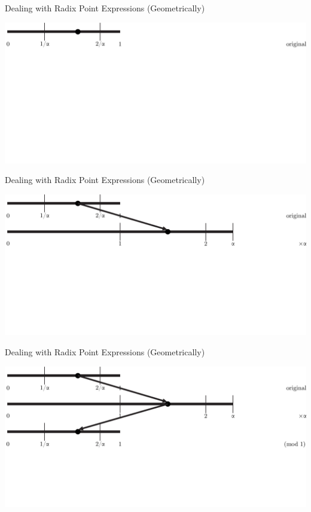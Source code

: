 \documentclass{beamer}
\begin{document}
\begin{frame}{Dealing with Radix Point Expressions (Geometrically)}
  \begin{example}
    \includegraphics[width=\textwidth,height=0.75\textheight]{images/silverratio/1}
  \end{example}
\end{frame}

\begin{frame}{Dealing with Radix Point Expressions (Geometrically)}
  \addtocounter{framenumber}{-1}
  \begin{example}
    \includegraphics[width=\textwidth,height=0.75\textheight]{images/silverratio/2}
  \end{example}
\end{frame}

\begin{frame}{Dealing with Radix Point Expressions (Geometrically)}
  \addtocounter{framenumber}{-1}
  \begin{example}
    \includegraphics[width=\textwidth,height=0.75\textheight]{images/silverratio/3}
  \end{example}
\end{frame}
\end{document}
